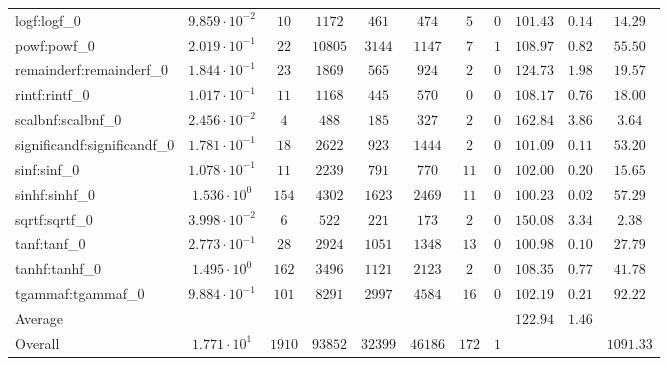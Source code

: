 \begin{tabular}{|l|c|c|c|c|c|c|c|c|c|c|}
logf:logf\_0                 & $ 9.859 \cdot 10^{-2} $ & $ 10     $ & $ 1172  $ & $ 461   $ & $ 474   $ & $ 5   $ & $ 0 $ & $ 101.43      $ & $ 0.14    $ & $ 14.29   $ \\
powf:powf\_0                 & $ 2.019 \cdot 10^{-1} $ & $ 22     $ & $ 10805 $ & $ 3144  $ & $ 1147  $ & $ 7   $ & $ 1 $ & $ 108.97      $ & $ 0.82    $ & $ 55.50   $ \\
remainderf:remainderf\_0     & $ 1.844 \cdot 10^{-1} $ & $ 23     $ & $ 1869  $ & $ 565   $ & $ 924   $ & $ 2   $ & $ 0 $ & $ 124.73      $ & $ 1.98    $ & $ 19.57   $ \\
rintf:rintf\_0               & $ 1.017 \cdot 10^{-1} $ & $ 11     $ & $ 1168  $ & $ 445   $ & $ 570   $ & $ 0   $ & $ 0 $ & $ 108.17      $ & $ 0.76    $ & $ 18.00   $ \\
scalbnf:scalbnf\_0           & $ 2.456 \cdot 10^{-2} $ & $ 4      $ & $ 488   $ & $ 185   $ & $ 327   $ & $ 2   $ & $ 0 $ & $ 162.84      $ & $ 3.86    $ & $ 3.64    $ \\
significandf:significandf\_0 & $ 1.781 \cdot 10^{-1} $ & $ 18     $ & $ 2622  $ & $ 923   $ & $ 1444  $ & $ 2   $ & $ 0 $ & $ 101.09      $ & $ 0.11    $ & $ 53.20   $ \\
sinf:sinf\_0                 & $ 1.078 \cdot 10^{-1} $ & $ 11     $ & $ 2239  $ & $ 791   $ & $ 770   $ & $ 11  $ & $ 0 $ & $ 102.00      $ & $ 0.20    $ & $ 15.65   $ \\
sinhf:sinhf\_0               & $ 1.536 \cdot 10^{0}  $ & $ 154    $ & $ 4302  $ & $ 1623  $ & $ 2469  $ & $ 11  $ & $ 0 $ & $ 100.23      $ & $ 0.02    $ & $ 57.29   $ \\
sqrtf:sqrtf\_0               & $ 3.998 \cdot 10^{-2} $ & $ 6      $ & $ 522   $ & $ 221   $ & $ 173   $ & $ 2   $ & $ 0 $ & $ 150.08      $ & $ 3.34    $ & $ 2.38    $ \\
tanf:tanf\_0                 & $ 2.773 \cdot 10^{-1} $ & $ 28     $ & $ 2924  $ & $ 1051  $ & $ 1348  $ & $ 13  $ & $ 0 $ & $ 100.98      $ & $ 0.10    $ & $ 27.79   $ \\
tanhf:tanhf\_0               & $ 1.495 \cdot 10^{0}  $ & $ 162    $ & $ 3496  $ & $ 1121  $ & $ 2123  $ & $ 2   $ & $ 0 $ & $ 108.35      $ & $ 0.77    $ & $ 41.78   $ \\
tgammaf:tgammaf\_0           & $ 9.884 \cdot 10^{-1} $ & $ 101    $ & $ 8291  $ & $ 2997  $ & $ 4584  $ & $ 16  $ & $ 0 $ & $ 102.19      $ & $ 0.21    $ & $ 92.22   $ \\
\hline
Average                      & $                     $ & $        $ & $       $ & $       $ & $       $ & $     $ & $   $ & $ 122.94      $ & $ 1.46    $ & $         $ \\
\hline
Overall                      & $ 1.771 \cdot 10^{1}  $ & $ 1910   $ & $ 93852 $ & $ 32399 $ & $ 46186 $ & $ 172 $ & $ 1 $ & $             $ & $         $ & $ 1091.33 $ \\
\hline
\end{tabular}
